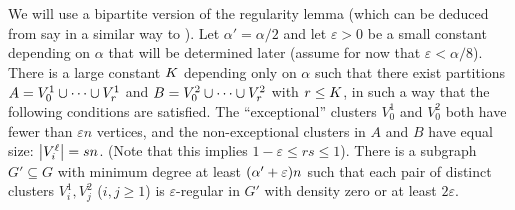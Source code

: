 \documentclass[11pt,english]{article}
\theoremstyle{plain}
\theoremstyle{definition}
\theoremstyle{definition}
\theoremstyle{plain}
\theoremstyle{plain}
\theoremstyle{plain}
\theoremstyle{plain}
\theoremstyle{remark}
\theoremstyle{remark}
\let\originalleft\left
\let\originalright\right
\renewcommand{\left}{\mathopen{}\mathclose\bgroup\originalleft}
\renewcommand{\right}{\aftergroup\egroup\originalright}
\begin{document}
We will use a bipartite version of the regularity lemma (which can
be deduced from say \cite[Theorem~2.3]{Tao05} in a similar way to
\cite[Theorem~1.10]{KS96}). Let $\alpha'=\alpha/2$ and let $\varepsilon>0$
be a small constant depending on $\alpha$ that will be determined
later (assume for now that $\varepsilon<\alpha/8$). There is a large
constant $K$ depending only on $\alpha$ such that there exist partitions
$A=V_{0}^{1}\cup\dots\cup V_{r}^{1}$ and $B=V_{0}^{2}\cup\dots\cup V_{r}^{2}$
with $r\le K$, in such a way that the following conditions are satisfied.
The ``exceptional'' clusters $V_{0}^{1}$ and $V_{0}^{2}$ both
have fewer than $\varepsilon n$ vertices, and the non-exceptional
clusters in $A$ and $B$ have equal size: $\left|V_{i}^{\ell}\right|=\s n$. (Note that this implies $1-\varepsilon\le rs\le1$).
There is a subgraph $G'\subseteq G$ with minimum degree at least
$\left(\alpha'+\varepsilon\right)n$ such that each pair of distinct
clusters $V_{i}^{1},V_{j}^{2}$ ($i,j\ge1$) is $\varepsilon$-regular
in $G'$ with density zero or at least $2\varepsilon$.
\end{document}
